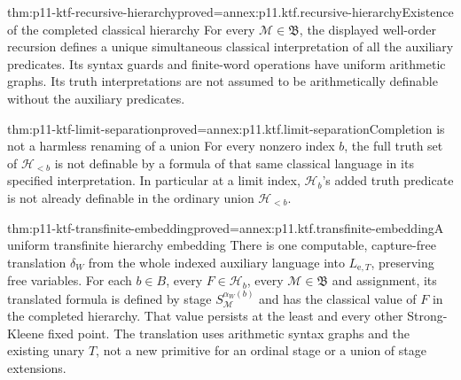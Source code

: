\begin{hblemma}{thm:p11-ktf-recursive-hierarchy}{proved=annex:p11.ktf.recursive-hierarchy}{Existence of the completed classical hierarchy}
For every \(\mathcal M\in\mathfrak B\), the displayed
well-order recursion defines a unique simultaneous classical
interpretation of all the auxiliary predicates. Its syntax guards
and finite-word operations have uniform arithmetic graphs. Its
truth interpretations are not assumed to be arithmetically definable
without the auxiliary predicates.
\end{hblemma}

\begin{hbcorollary}{thm:p11-ktf-limit-separation}{proved=annex:p11.ktf.limit-separation}{Completion is not a harmless renaming of a union}
For every nonzero index \(b\), the full truth set of
\(\mathcal H_{<b}\) is not definable by a formula of that
same classical language in its specified interpretation. In particular
at a limit index, \(\mathcal H_b\)'s added truth predicate
is not already definable in the ordinary union
\(\mathcal H_{<b}\).
\end{hbcorollary}

\begin{hbtheorem}{thm:p11-ktf-transfinite-embedding}{proved=annex:p11.ktf.transfinite-embedding}{A uniform transfinite hierarchy embedding}
There is one computable, capture-free translation
\(\delta_W\) from the whole indexed auxiliary language into
\(L_{\mathrm e,T}\), preserving free variables. For each
\(b\in B\), every \(F\in\mathcal H_b\), every
\(\mathcal M\in\mathfrak B\) and assignment, its translated
formula is defined by stage \(S_{\mathcal M}^{\alpha_W(b)}\)
and has the classical value of \(F\) in the completed hierarchy.
That value persists at the least and every other Strong-Kleene
fixed point. The translation uses arithmetic syntax graphs and
the existing unary \(T\), not a new primitive for an ordinal
stage or a union of stage extensions.
\end{hbtheorem}

